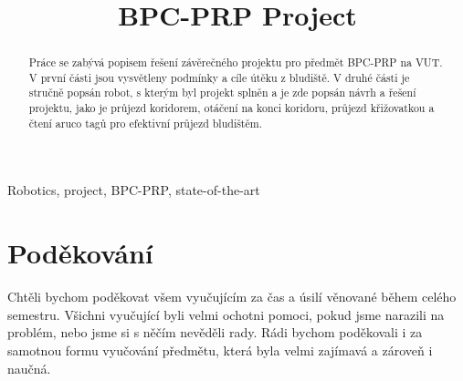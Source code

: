 \documentclass[conference]{IEEEtran}
\begin{document}
\title{BPC-PRP Project}

\author{
\and
{}
}
\cr
\maketitle

\begin{abstract}
Práce se zabývá popisem řešení závěrečného projektu pro předmět BPC-PRP na VUT. V první části jsou vysvětleny podmínky a cíle útěku z bludiště. V druhé části je stručně popsán robot, s kterým byl projekt splněn a je zde popsán návrh a řešení projektu, jako je průjezd koridorem, otáčení na konci koridoru, průjezd křižovatkou a čtení aruco tagů pro efektivní průjezd bludištěm.
\end{abstract}

\begin{IEEEkeywords}
Robotics, project, BPC-PRP, state-of-the-art
\end{IEEEkeywords}







\section*{Poděkování}
Chtěli bychom poděkovat všem vyučujícím za čas a úsilí věnované během celého semestru. Všichni vyučující byli velmi ochotni pomoci, pokud jsme narazili na problém, nebo jsme si s něčím nevěděli rady. Rádi bychom poděkovali i za samotnou formu vyučování předmětu, která byla velmi zajímavá a zároveň i naučná.

\printbibliography
\end{document}
